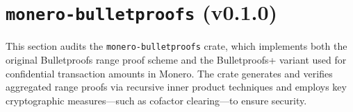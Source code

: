 \documentclass[12pt,a4paper]{article}
\begin{document}






\section{\texttt{monero-bulletproofs} (v0.1.0)}
This section audits the \texttt{monero-bulletproofs} crate, which implements both the original Bulletproofs range proof scheme and the Bulletproofs+ variant used for confidential transaction amounts in Monero. The crate generates and verifies aggregated range proofs via recursive inner product techniques and employs key cryptographic measures---such as cofactor clearing---to ensure security.
\end{document}
